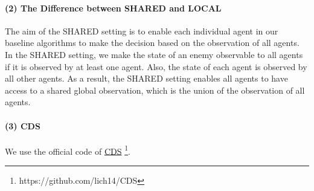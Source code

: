 \documentclass[letterpaper]{article} \usepackage{aaai23}  \usepackage{times}  \usepackage{helvet}  \usepackage{courier}  \usepackage[hyphens]{url}  \usepackage{graphicx} \urlstyle{rm} \def\UrlFont{\rm}  \usepackage{natbib}  \usepackage{caption} \frenchspacing  \setlength{\pdfpagewidth}{8.5in} \setlength{\pdfpageheight}{11in} \usepackage{algorithm}
\begin{document}
\paragraph{(2) The Difference between SHARED and LOCAL} The aim of the SHARED setting is to enable each individual agent in our baseline algorithms to make the decision based on the observation of all agents. In the SHARED setting, we make the state of an enemy observable to all agents if it is observed by at least one agent. Also, the state of each agent is observed by all other agents. As a result, the SHARED setting enables all agents to have access to a shared global observation, which is the union of the observation of all agents.


\paragraph{(3) CDS\citeyear{cds}} 
We use the official code of \href{https://github.com/lich14/CDS}{CDS} \footnote{https://github.com/lich14/CDS}.
\end{document}
